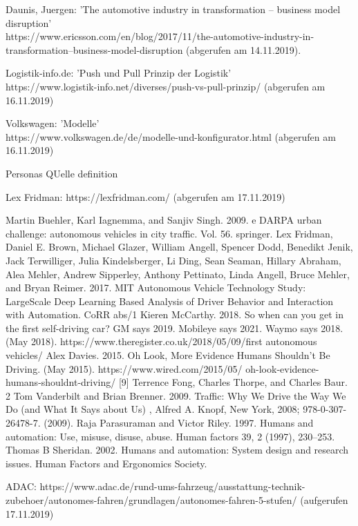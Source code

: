 \begin{thebibliography}{00}

Daunis, Juergen: 'The automotive industry in transformation – business model disruption'\\
 https://www.ericsson.com/en/blog/2017/11/the-automotive-industry-in-transformation--business-model-disruption (abgerufen am 14.11.2019).

Logistik-info.de: 'Push und Pull Prinzip der Logistik'\\
https://www.logistik-info.net/diverses/push-vs-pull-prinzip/ (abgerufen am 16.11.2019)

Volkswagen: 'Modelle'\\
https://www.volkswagen.de/de/modelle-und-konfigurator.html (abgerufen am 16.11.2019)

Personas QUelle definition

Lex Fridman: https://lexfridman.com/ (abgerufen am 17.11.2019)

Martin Buehler, Karl Iagnemma, and Sanjiv Singh. 2009. e DARPA
urban challenge: autonomous vehicles in city traffic. Vol. 56. springer.
 Lex Fridman, Daniel E. Brown, Michael Glazer, William Angell,
Spencer Dodd, Benedikt Jenik, Jack Terwilliger, Julia Kindelsberger,
Li Ding, Sean Seaman, Hillary Abraham, Alea Mehler, Andrew Sipperley, Anthony Pettinato, Linda Angell, Bruce Mehler, and Bryan
Reimer. 2017. MIT Autonomous Vehicle Technology Study: LargeScale Deep Learning Based Analysis of Driver Behavior and Interaction with Automation. CoRR abs/1
Kieren McCarthy. 2018. So when can you get in the first self-driving
car? GM says 2019. Mobileye says 2021. Waymo says 2018. (May
2018). https://www.theregister.co.uk/2018/05/09/first autonomous
vehicles/
Alex Davies. 2015. Oh Look, More Evidence Humans Shouldn’t
Be Driving. (May 2015). https://www.wired.com/2015/05/
oh-look-evidence-humans-shouldnt-driving/
[9] Terrence Fong, Charles Thorpe, and Charles Baur. 2
Tom Vanderbilt and Brian Brenner. 2009. Traffic: Why We Drive the
Way We Do (and What It Says about Us) , Alfred A. Knopf, New York,
2008; 978-0-307-26478-7. (2009).
Raja Parasuraman and Victor Riley. 1997. Humans and automation:
Use, misuse, disuse, abuse. Human factors 39, 2 (1997), 230–253.
Thomas B Sheridan. 2002. Humans and automation: System design and
research issues. Human Factors and Ergonomics Society.

ADAC: https://www.adac.de/rund-ums-fahrzeug/ausstattung-technik-zubehoer/autonomes-fahren/grundlagen/autonomes-fahren-5-stufen/ (aufgerufen 17.11.2019)


\end{thebibliography}
